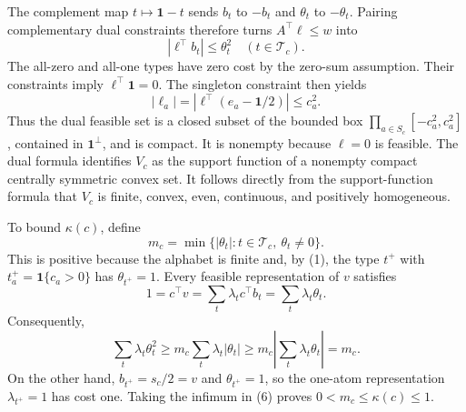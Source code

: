 The complement map \(t\mapsto\mathbf 1-t\) sends \(b_t\) to \(-b_t\) and \(\theta_t\) to \(-\theta_t\).  Pairing complementary dual constraints therefore turns \(A^\top\ell\le w\) into
\[
|\ell^\top b_t|\le\theta_t^2
\quad(t\in\mathcal T_c).
\tag{4}
\]
The all-zero and all-one types have zero cost by the zero-sum assumption.  Their constraints imply \(\ell^\top\mathbf 1=0\).  The singleton constraint then yields
\[
|\ell_a|=|\ell^\top(e_a-\mathbf 1/2)|\le c_a^2.
\tag{5}
\]
Thus the dual feasible set is a closed subset of the bounded box \(\prod_{a\in S_c}[-c_a^2,c_a^2]\), contained in \(\mathbf1^\perp\), and is compact.  It is nonempty because \(\ell=0\) is feasible.  The dual formula identifies \(V_c\) as the support function of a nonempty compact centrally symmetric convex set.  It follows directly from the support-function formula that \(V_c\) is finite, convex, even, continuous, and positively homogeneous.

To bound \(\kappa(c)\), define
\[
m_c=\min\{|\theta_t|:t\in\mathcal T_c,\ \theta_t\ne0\}.
\]
This is positive because the alphabet is finite and, by (1), the type \(t^+\) with \(t_a^+=\mathbf1\{c_a>0\}\) has \(\theta_{t^+}=1\).  Every feasible representation of \(v\) satisfies
\[
1=c^\top v=\sum_t\lambda_tc^\top b_t=\sum_t\lambda_t\theta_t.
\]
Consequently,
\[
\sum_t\lambda_t\theta_t^2
\ge m_c\sum_t\lambda_t|\theta_t|
\ge m_c\left|\sum_t\lambda_t\theta_t\right|=m_c.
\tag{6}
\]
On the other hand, \(b_{t^+}=s_c/2=v\) and \(\theta_{t^+}=1\), so the one-atom representation \(\lambda_{t^+}=1\) has cost one.  Taking the infimum in (6) proves \(0<m_c\le\kappa(c)\le1\).


